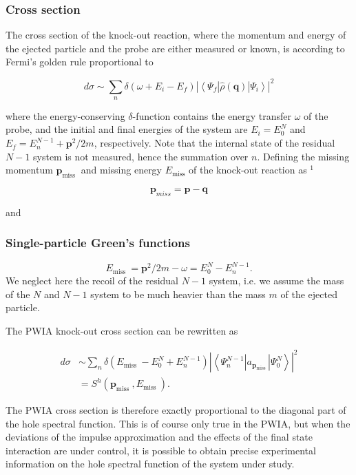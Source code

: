 \documentclass[compress]{beamer}
\begin{document}
{
\frametitle{Cross section}
\begin{small}
{\scriptsize
The cross section of the knock-out reaction, where the momentum and
energy of the ejected particle and the probe are either measured or
known, is according to Fermi's golden rule proportional to

$$
d \sigma \sim \sum_{n} \delta\left(\omega+E_{i}-E_{f}\right)\left|\left\langle\Psi_{f}|\hat{\rho}(\boldsymbol{q})| \Psi_{i}\right\rangle\right|^{2}
$$

where the energy-conserving $\delta$-function contains the energy
transfer $\omega$ of the probe, and the initial and final energies of
the system are $E_{i}=E_{0}^{N}$ and
$E_{f}=E_{n}^{N-1}+\boldsymbol{p}^{2} / 2 m$, respectively. Note that
the internal state of the residual $N-1$ system is not measured, hence
the summation over $n$. Defining the missing momentum
$\boldsymbol{p}_{\text {miss }}$ and missing energy $E_{\text {miss
}}$ of the knock-out reaction as ${ }^{1}$

$$
\boldsymbol{p}_{m i s s}=\boldsymbol{p}-\boldsymbol{q}
$$

and

}
\end{small}
}
\frame
{
\frametitle{Single-particle Green's functions}
\begin{small}
{\scriptsize

\[
E_{\text {miss }}=\boldsymbol{p}^{2} / 2 m-\omega=E_{0}^{N}-E_{n}^{N-1}.
\]
We  neglect here the recoil of the residual $N-1$ system, i.e. we assume the mass of the $N$ and $N-1$ system to be much
heavier than the mass $m$ of the ejected particle.

The PWIA knock-out cross section can be rewritten as

\[
\begin{aligned}
d \sigma & \sim \sum_{n} \delta\left(E_{\text {miss }}-E_{0}^{N}+E_{n}^{N-1}\right)\left|\left\langle\Psi_{n}^{N-1}\left|a_{\boldsymbol{p}_{\text {miss }}}\right| \Psi_{0}^{N}\right\rangle\right|^{2} \\
& =S^{h}\left(\boldsymbol{p}_{\text {miss }}, E_{\text {miss }}\right) .
\end{aligned}
\]

The PWIA cross section is therefore exactly proportional to the
diagonal part of the hole spectral function. This is of course only
true in the PWIA, but when the deviations of the impulse approximation
and the effects of the final state interaction are under control, it
is possible to obtain precise experimental information on the hole
spectral function of the system under study.
}
\end{small}
}
\end{document}
